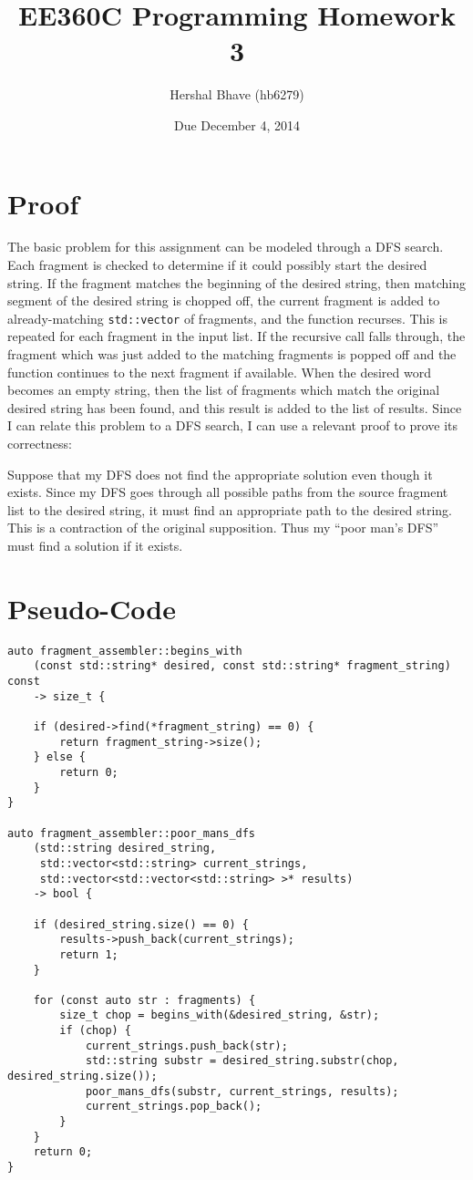 \documentclass{article}
\title{EE360C Programming Homework 3}
\author{Hershal Bhave (hb6279)}
\date{Due December 4, 2014}
\begin{document}
\maketitle

\section{Proof}
The basic problem for this assignment can be modeled through a DFS
search. Each fragment is checked to determine if it could possibly
start the desired string. If the fragment matches the beginning of the
desired string, then matching segment of the desired string is chopped
off, the current fragment is added to already-matching
\verb|std::vector| of fragments, and the function recurses. This is
repeated for each fragment in the input list. If the recursive call
falls through, the fragment which was just added to the matching
fragments is popped off and the function continues to the next
fragment if available. When the desired word becomes an empty string,
then the list of fragments which match the original desired string has
been found, and this result is added to the list of results. Since I
can relate this problem to a DFS search, I can use a relevant proof to
prove its correctness:

Suppose that my DFS does not find the appropriate solution even though
it exists. Since my DFS goes through all possible paths from the
source fragment list to the desired string, it must find an
appropriate path to the desired string. This is a contraction of the
original supposition. Thus my ``poor man's DFS'' must find a solution
if it exists.

\pagebreak[4]
\section{Pseudo-Code}
{\footnotesize
\begin{verbatim}
auto fragment_assembler::begins_with
    (const std::string* desired, const std::string* fragment_string) const
    -> size_t {

    if (desired->find(*fragment_string) == 0) {
        return fragment_string->size();
    } else {
        return 0;
    }
}

auto fragment_assembler::poor_mans_dfs
    (std::string desired_string,
     std::vector<std::string> current_strings,
     std::vector<std::vector<std::string> >* results) 
    -> bool {

    if (desired_string.size() == 0) {
        results->push_back(current_strings);
        return 1;
    }

    for (const auto str : fragments) {
        size_t chop = begins_with(&desired_string, &str);
        if (chop) {
            current_strings.push_back(str);
            std::string substr = desired_string.substr(chop, desired_string.size());
            poor_mans_dfs(substr, current_strings, results);
            current_strings.pop_back();
        }
    }
    return 0;
}
\end{verbatim}
}
\end{document}
